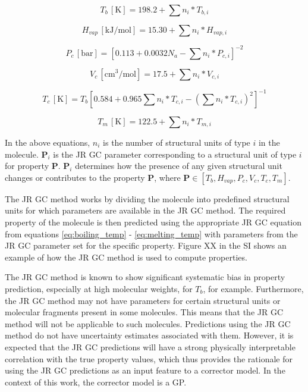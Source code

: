 \documentclass[journal=jacsat,manuscript=article]{achemso}
\begin{document}
\begin{equation}
    T_b \, [\text{K}] = 198.2 + \sum n_{i} * T_{b,i}
    \label{eq:boiling_temp}
\end{equation}


\begin{equation}
    H_{vap} \, [\text{kJ/mol}] = 15.30 + \sum n_{i} * H_{vap,i}
    \label{eq:enthalpy_vap}
\end{equation}


\begin{equation}
    P_c \, [\text{bar}] = \left[ 0.113 + 0.0032 N_a - \sum n_{i} * P_{c,i} \right]^{-2}
    \label{eq:critical_pressure}
\end{equation}

\begin{equation}
    V_c \, [\text{cm}^3/\text{mol}] = 17.5 + \sum n_{i} * V_{c,i}
    \label{eq:critical_mol_vol}
\end{equation}

\begin{equation}
    T_c \, [\text{K}] = T_b \left[ 0.584 + 0.965 \sum n_{i} * T_{c,i} - \left( \sum n_{i} * T_{c,i} \right)^2 \right]^{-1}
    \label{eq:critical_temperature}
\end{equation}


\begin{equation}
    T_m \, [\text{K}] = 122.5 + \sum n_{i} * T_{m,i}
    \label{eq:melting_temp}
\end{equation}

In the above equations, $n_{i}$ is the number of structural units of type $i$ in the molecule. $\textbf{P}_i$ is the JR GC parameter corresponding to a structural unit of type $i$ for property $\textbf{P}$. $\textbf{P}_i$ determines how the presence of any given structural unit changes or contributes to the property $\textbf{P}$, where $\textbf{P} \in [T_b, H_{vap}, P_c,V_c, T_c, T_m]$.

The JR GC method works by dividing the molecule into predefined structural units for which parameters are available in the JR GC method. The required property of the molecule is then predicted using the appropriate JR GC equation from equations \ref{eq:boiling_temp} - \ref{eq:melting_temp} with parameters from the JR GC parameter set for the specific property. Figure XX in the SI shows an example of how the JR GC method is used to compute properties.

The JR GC method is known to show significant systematic bias in property prediction, especially at high molecular weights, for $T_b$, for example. Furthermore, the JR GC method may not have parameters for certain structural units or molecular fragments present in some molecules. This means that the JR GC method will not be applicable to such molecules. Predictions using the JR GC method do not have uncertainty estimates associated with them. However, it is expected that the JR GC predictions will have a strong physically interpretable correlation with the true property values, which thus provides the rationale for using the JR GC predictions as an input feature to a corrector model. In the context of this work, the corrector model is a GP.
\end{document}
